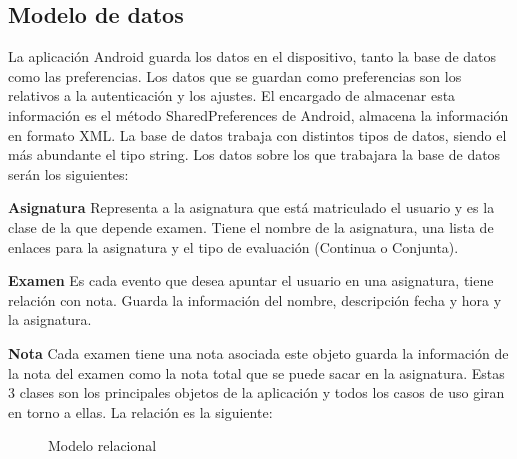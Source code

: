 \subsection{Modelo de datos}
\label{subsecc:modelo de datos}

La aplicación Android guarda los datos en el dispositivo, tanto la base de datos como las preferencias.
Los datos que se guardan como preferencias son los relativos a la autenticación y los ajustes. El encargado de almacenar esta información es el método SharedPreferences de Android, almacena la información en formato XML.
La base de datos trabaja con distintos tipos de datos, siendo el más abundante el tipo string.
Los datos sobre los que trabajara la base de datos serán los siguientes:

\textbf{Asignatura} Representa a la asignatura que está matriculado el usuario y es la clase de la que depende examen. Tiene el nombre de la asignatura, una  lista de enlaces para la asignatura  y el tipo de evaluación (Continua o Conjunta).

\textbf{Examen} Es cada evento que desea apuntar el usuario en una asignatura, tiene relación con nota. Guarda la información del nombre, descripción fecha y hora y la asignatura.

\textbf{Nota} Cada examen tiene una nota asociada este objeto guarda la información de la nota del examen como la nota total que se puede sacar en la asignatura.
Estas 3 clases son los principales objetos de la aplicación y todos los casos de uso giran en torno a ellas.
La relación es la siguiente:

\begin{figure}[H] 
  \begin{center} 
    \caption{Modelo relacional} 
    \label{fig:ModeloRelacional} 
  \end{center} 
\end{figure}

